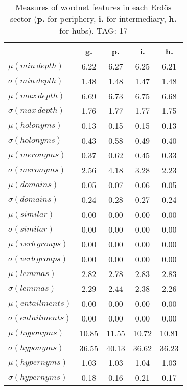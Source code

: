 \begin{table}[h!]
\begin{center}
\begin{tabular}{| l | c | c | c | c |}\hline
 & g. & p. & i. & h. \\\hline
$\mu(min\,depth)$ & 6.22  & 6.27  & 6.25  & 6.21 \\\hline
$\sigma(min\,depth)$ & 1.48  & 1.48  & 1.47  & 1.48 \\\hline
$\mu(max\,depth)$ & 6.69  & 6.73  & 6.75  & 6.68 \\\hline
$\sigma(max\,depth)$ & 1.76  & 1.77  & 1.77  & 1.75 \\\hline
$\mu(holonyms)$ & 0.13  & 0.15  & 0.15  & 0.13 \\\hline
$\sigma(holonyms)$ & 0.43  & 0.58  & 0.49  & 0.40 \\\hline
$\mu(meronyms)$ & 0.37  & 0.62  & 0.45  & 0.33 \\\hline
$\sigma(meronyms)$ & 2.56  & 4.18  & 3.28  & 2.23 \\\hline
$\mu(domains)$ & 0.05  & 0.07  & 0.06  & 0.05 \\\hline
$\sigma(domains)$ & 0.24  & 0.28  & 0.27  & 0.24 \\\hline
$\mu(similar)$ & 0.00  & 0.00  & 0.00  & 0.00 \\\hline
$\sigma(similar)$ & 0.00  & 0.00  & 0.00  & 0.00 \\\hline
$\mu(verb\,groups)$ & 0.00  & 0.00  & 0.00  & 0.00 \\\hline
$\sigma(verb\,groups)$ & 0.00  & 0.00  & 0.00  & 0.00 \\\hline
$\mu(lemmas)$ & 2.82  & 2.78  & 2.83  & 2.83 \\\hline
$\sigma(lemmas)$ & 2.29  & 2.44  & 2.38  & 2.26 \\\hline
$\mu(entailments)$ & 0.00  & 0.00  & 0.00  & 0.00 \\\hline
$\sigma(entailments)$ & 0.00  & 0.00  & 0.00  & 0.00 \\\hline
$\mu(hyponyms)$ & 10.85  & 11.55  & 10.72  & 10.81 \\\hline
$\sigma(hyponyms)$ & 36.55  & 40.13  & 36.62  & 36.23 \\\hline
$\mu(hypernyms)$ & 1.03  & 1.03  & 1.04  & 1.03 \\\hline
$\sigma(hypernyms)$ & 0.18  & 0.16  & 0.21  & 0.17 \\\hline
\end{tabular}
\caption{Measures of wordnet features in each Erd\"os sector ({{\bf p.}} for periphery, {{\bf i.}} for intermediary, {{\bf h.}} for hubs). TAG: 17}
\end{center}
\end{table}